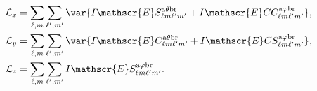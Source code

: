 %
\begin{align}
\mathcal{L}_x &= 
\sum_{\ell, m} \sum_{\ell^{\prime}, m^{\prime}} 
\var{I\mathscr{E}S_{\ell m \ell^{\prime} m^{\prime}}^{\rm a \theta b r} + 
I\mathscr{E}CC_{\ell m \ell^{\prime} m^{\prime}}^{\rm a \varphi b r}}, \label{eq: Lx spectral integral angles solved}\\
% 
\mathcal{L}_y &= 
\sum_{\ell, m} \sum_{\ell^{\prime}, m^{\prime}}
\var{I\mathscr{E}C_{\ell m \ell^{\prime} m^{\prime}}^{\rm a \theta b r} + 
I\mathscr{E}CS_{\ell m \ell^{\prime} m^{\prime}}^{\rm a \varphi b r}}, \label{eq: Ly spectral integral angles solved}\\ 
%
\mathcal{L}_z &= 
\sum_{\ell, m} \sum_{\ell^{\prime}, m^{\prime}}
I\mathscr{E}S_{\ell m \ell^{\prime} m^{\prime}}^{\rm a \varphi b r}. \label{eq: Lz spectral integral angles solved}
\end{align}
%